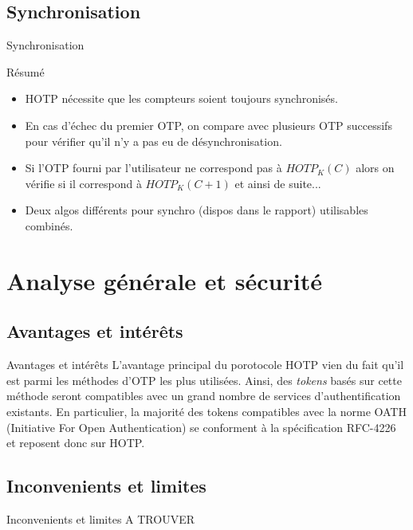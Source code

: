 \documentclass{beamer}
\begin{document}
\subsection{Synchronisation}

\begin{frame}{Synchronisation}
\begin{block}{R\'esum\'e}
\begin{itemize}
\item HOTP n\'ecessite que les compteurs soient toujours synchronis\'es.
\pause \item En cas d'\'echec du premier OTP, on compare avec plusieurs OTP successifs pour v\'erifier qu'il n'y a pas eu de d\'esynchronisation.
\pause \item  Si l'OTP fourni par l'utilisateur ne correspond pas \`a $HOTP_K(C)$ alors on v\'erifie si il correspond \`a $HOTP_K(C + 1)$ et ainsi de suite...
\pause\item Deux algos diff\'erents pour synchro (dispos dans le rapport) utilisables combin\'es.
\end{itemize}
\end{block}
\end{frame}


\section{Analyse g\'en\'erale et s\'ecurit\'e}
\subsection{Avantages et int\'er\^ets}
\begin{frame}{Avantages et int\'er\^ets}
L'avantage principal du porotocole \og{}HOTP\fg{} vien du fait qu'il est parmi les m\'ethodes d'OTP les plus utilis\'ees. Ainsi, des \emph{tokens} bas\'es sur cette m\'ethode 
  seront compatibles avec un grand nombre de services d'authentification existants. En particulier, la majorit\'e des tokens compatibles avec la norme OATH (Initiative For 
  Open Authentication) se conforment \`a la sp\'ecification RFC-4226 et reposent donc sur HOTP.
\end{frame}
  
  
  \subsection{Inconvenients et limites}
\begin{frame}{Inconvenients et limites}
A TROUVER 
\end{frame}
  
\end{document}
